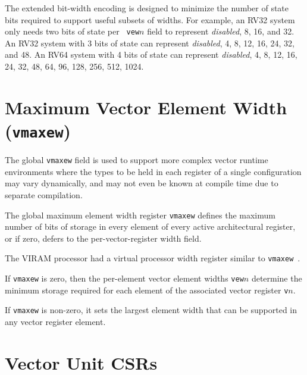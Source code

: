 \begin{commentary}
    The extended bit-width encoding is designed to minimize the number
    of state bits required to support useful subsets of widths. For
    example, an RV32 system only needs two bits of state per {\tt
      vew}$n$ field to represent {\em disabled}, 8, 16, and 32. An
    RV32 system with 3 bits of state can represent {\em disabled}, 4,
    8, 12, 16, 24, 32, and 48.  An RV64 system with 4 bits of state
    can represent {\em disabled}, 4, 8, 12, 16, 24, 32, 48, 64, 96,
    128, 256, 512, 1024.
\end{commentary}

\clearpage

\section{Maximum Vector Element Width ({\tt vmaxew})}

The global {\tt vmaxew} field is used to support more complex vector
runtime environments where the types to be held in each register of a
single configuration may vary dynamically, and may not even be known
at compile time due to separate compilation.

The global maximum element width register {\tt vmaxew} defines the
maximum number of bits of storage in every element of every active
architectural register, or if zero, defers to the per-vector-register
width field.

\begin{commentary}
  The VIRAM processor had a virtual processor width
  register similar to {\tt vmaxew}~\cite{VIRAM}.
\end{commentary}

If {\tt vmaxew} is zero, then the per-element vector element widths
{\tt vew}$n$ determine the minimum storage required for each element
of the associated vector register {\tt v}$n$.

If {\tt vmaxew} is non-zero, it sets the largest element width that
can be supported in any vector register element.

\clearpage

\section{Vector Unit CSRs}

